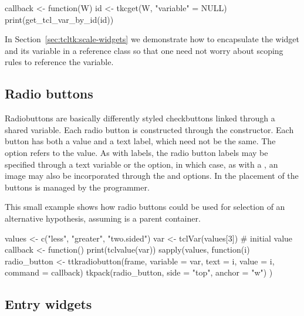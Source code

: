 \begin{Schunk}
\begin{Sinput}
 callback <- function(W) {
   id <- tkcget(W, "variable" = NULL)
   print(get_tcl_var_by_id(id))
 }
\end{Sinput}
\end{Schunk}


In Section~\ref{sec:tcltk:scale-widgets} we demonstrate how to encapsulate the widget and its
variable in a reference class so that one need not worry about scoping
rules to reference the variable. 


\subsection{Radio buttons}
\label{sec:tcltk:radio-buttons}

Radiobuttons are basically differently styled checkbuttons linked through a shared \TCL\/
variable. Each radio button is constructed through the
 constructor. Each button has both a value and
a text label, which need not be the same. The
 option refers to the
value. As with labels, the radio button labels may be specified
through a text variable or the  option,
in which case, as with a , an image may also be
incorporated through the  and
 options. In \TK\/ the placement of
the buttons is managed by the programmer.


This small example shows how radio buttons could be used for selection
of an alternative hypothesis, assuming  is a parent container.

\begin{Schunk}
\begin{Sinput}
 values <- c("less", "greater", "two.sided")
 var <- tclVar(values[3])                # initial value
 callback <- function() print(tclvalue(var))
 sapply(values, function(i) {
   radio_button <- ttkradiobutton(frame, variable = var, 
                                  text = i, value = i, 
                                  command = callback)
   tkpack(radio_button, side = "top", anchor = "w")
 })
\end{Sinput}
\end{Schunk}

\subsection{Entry widgets}
\label{sec:tcltk:entry-widgets}

